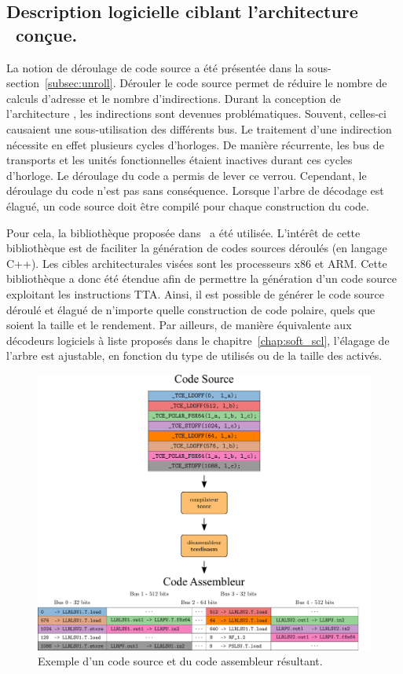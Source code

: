 \subsection{Description logicielle ciblant l'architecture \TTSC~conçue.}

La notion de déroulage de code source a été présentée dans la sous-section~\ref{subsec:unroll}. Dérouler le code source permet de réduire le nombre de calculs d'adresse et le nombre d'indirections. Durant la conception de l'architecture \TTSC, les indirections sont devenues problématiques. Souvent, celles-ci causaient une sous-utilisation des différents bus. Le traitement d'une indirection nécessite en effet plusieurs cycles d'horloges. De manière récurrente, les bus de transports et les unités fonctionnelles étaient inactives durant ces cycles d'horloge. Le déroulage du code a permis de lever ce verrou. Cependant, le déroulage du code n'est pas sans conséquence. Lorsque l'arbre de décodage est élagué, un code source doit être compilé pour chaque construction du code.

Pour cela, la bibliothèque proposée dans~\cite{cassagne_efficient_2015} a été utilisée. L'intérêt de cette bibliothèque est de faciliter la génération de codes sources déroulés (en langage C++). Les cibles architecturales visées sont les processeurs x86 et ARM. Cette bibliothèque a donc été étendue afin de permettre la génération d'un code source exploitant les instructions TTA. Ainsi, il est possible de générer le code source déroulé et élagué de n'importe quelle construction de code polaire, quels que soient la taille et le rendement. Par ailleurs, de manière équivalente aux décodeurs logiciels à liste proposés dans le chapitre~\ref{chap:soft_scl}, l'élagage de l'arbre est ajustable, en fonction du type de \noeuds utilisés ou de la taille des \noeuds activés.


\begin{figure}[t]
\centering
\includegraphics[width=\textwidth]{main/ch4_fig/ilp_1}
\caption{Exemple d'un code source et du code assembleur résultant.}
\label{fig:ilp_1}
\end{figure}


